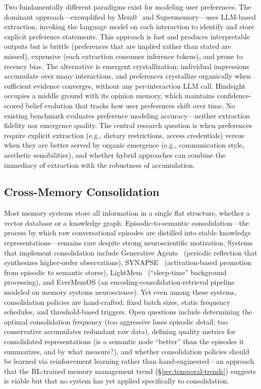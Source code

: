 Two fundamentally different paradigms exist for modeling user
preferences. The dominant approach---exemplified by
Mem0~\cite{choudhary2025mem0} and Supermemory---uses LLM-based
extraction, invoking the language model on each interaction to
identify and store explicit preference statements. This approach is
fast and produces interpretable outputs but is brittle (preferences
that are implied rather than stated are missed), expensive (each
extraction consumes inference tokens), and prone to recency bias.
The alternative is emergent crystallization: individual impressions
accumulate over many interactions, and preferences crystallize
organically when sufficient evidence converges, without any
per-interaction LLM call. Hindsight~\cite{latimer2025hindsight}
occupies a middle ground with its opinion memory, which maintains
confidence-scored belief evolution that tracks how user preferences
shift over time. No existing benchmark evaluates preference modeling
accuracy---neither extraction fidelity nor emergence quality. The
central research question is when preferences require explicit
extraction (e.g., dietary restrictions, access credentials) versus
when they are better served by organic emergence (e.g., communication
style, aesthetic sensibilities), and whether hybrid approaches can
combine the immediacy of extraction with the robustness of
accumulation.

\subsection{Cross-Memory Consolidation}

Most memory systems store all information in a single flat structure,
whether a vector database or a knowledge graph. Episodic-to-semantic
consolidation---the process by which raw conversational episodes are
distilled into stable knowledge representations---remains rare
despite strong neuroscientific motivation. Systems that implement
consolidation include Generative
Agents~\cite{park2023generative} (periodic reflection that
synthesizes higher-order observations),
SYNAPSE~\cite{jiang2026synapse} (activation-based promotion from
episodic to semantic stores),
LightMem~\cite{fang2025lightmem} (``sleep-time'' background
processing), and EverMemOS (an encoding-consolidation-retrieval
pipeline modeled on memory systems neuroscience). Yet even among
these systems, consolidation policies are hand-crafted: fixed batch
sizes, static frequency schedules, and threshold-based triggers.
Open questions include determining the optimal consolidation frequency
(too aggressive loses episodic detail; too conservative accumulates
redundant raw data), defining quality metrics for consolidated
representations (is a semantic node ``better'' than the episodes it
summarizes, and by what measure?), and whether consolidation policies
should be learned via reinforcement learning rather than
hand-engineered---an approach that the RL-trained memory management
trend (\S\ref{sec:temporal-trends}) suggests is viable but that no
system has yet applied specifically to consolidation.

